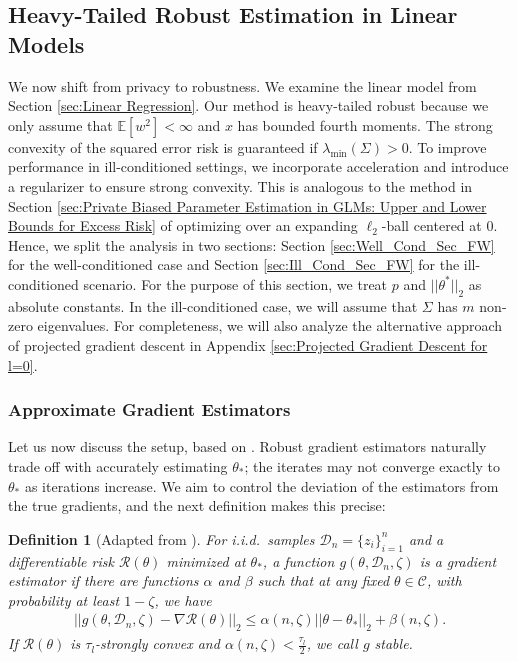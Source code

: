 \documentclass{article}
\newtheorem{definition}{Definition}[section]
\newcommand{\iid}{i.i.d.{\ }}
\begin{document}
\subsection{Heavy-Tailed Robust Estimation in Linear Models}\label{sec:Biased Parameter Estimation HT}

We now shift from privacy to robustness. We examine the linear model from Section \ref{sec:Linear Regression}. Our method is heavy-tailed robust because we only assume that $\mathbb{E}[w^2] < \infty$ and $x$ has bounded fourth moments. The strong convexity of the squared error risk is guaranteed if $\lambda_{\min}(\Sigma) > 0$. To improve performance in ill-conditioned settings, we incorporate acceleration and introduce a regularizer to ensure strong convexity. This is analogous to the method in Section \ref{sec:Private Biased Parameter Estimation in GLMs: Upper and Lower Bounds for Excess Risk} of optimizing over an expanding $\ell_2$-ball centered at $0$. Hence, we split the analysis in two sections: Section \ref{sec:Well_Cond_Sec_FW} for the well-conditioned case and Section \ref{sec:Ill_Cond_Sec_FW} for the ill-conditioned scenario.
For the purpose of this section, we treat $p$ and $||\theta^*||_2$ as absolute constants. 
In the ill-conditioned case, we will assume that $\Sigma$ has $m$ non-zero eigenvalues.
For completeness, we will also analyze the alternative approach of projected gradient descent in Appendix \ref{sec:Projected Gradient Descent for l=0}.


\subsubsection{Approximate Gradient Estimators}

Let us now discuss the setup, based on \cite{RE}. Robust gradient estimators naturally trade off with accurately estimating $\theta_{*}$; the iterates may not converge exactly to $\theta_{*}$ as iterations increase. We aim to control the deviation of the estimators from the true gradients, and the next definition makes this precise:

\begin{definition}[Adapted from \cite{RE}]
\label{def:ge}
For \iid samples $\mathcal{D}_n = \{z_i\}_{i = 1}^n$ and a differentiable risk $\mathcal{R}(\theta)$ minimized at $\theta_*$, a function $g(\theta, \mathcal{D}_n, \zeta)$ is a \emph{gradient estimator} if there are functions $\alpha$ and $\beta$ such that at any fixed $\theta \in \mathcal{C}$, with probability at least $1 - \zeta$, we have
\begin{align*}
||g(\theta, \mathcal{D}_n, \zeta) - \nabla\mathcal{R}(\theta)||_2 \leq \alpha(n, \zeta)||\theta - \theta_*||_2 + \beta(n, \zeta).
\end{align*}
If $\mathcal{R}(\theta)$ is $\tau_l$-strongly convex and $\alpha(n, \zeta) < \frac{\tau_l}{2}$, we call $g$ \emph{stable}.
\end{definition}
\end{document}
